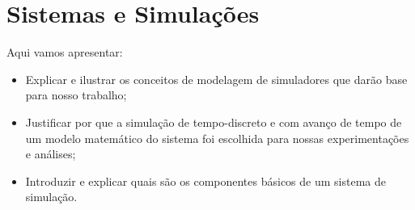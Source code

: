 \chapter{\label{chap:simulation}Sistemas e Simulações}

Aqui vamos apresentar:

\begin{itemize}
  \item Explicar e ilustrar os conceitos de modelagem de simuladores que darão base para nosso trabalho;
  \item Justificar por que a simulação de tempo-discreto e com avanço de tempo de um modelo matemático do sistema foi escolhida para nossas experimentações e análises;
  \item Introduzir e explicar quais são os componentes básicos de um sistema de simulação.
\end{itemize}
